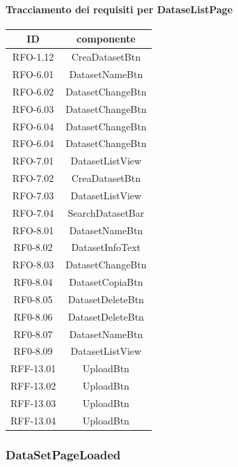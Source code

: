\paragraph{Tracciamento dei requisiti per DataseListPage}
\begin{tabularx}{\textwidth}{|c|c|}
    \hline
    \textbf{ID} & \textbf{componente} \\
    \hline
        RFO-1.12 & CreaDatasetBtn\\
    \hline
        RFO-6.01 & DatasetNameBtn\\
    \hline
        RFO-6.02 & DatasetChangeBtn\\
    \hline
        RFO-6.03 & DatasetChangeBtn\\
    \hline
        RFO-6.04 & DatasetChangeBtn\\
    \hline
        RFO-6.04 & DatasetChangeBtn\\
    \hline
        RFO-7.01 & DatasetListView\\
    \hline
        RFO-7.02 & CreaDatasetBtn\\
    \hline
        RFO-7.03 & DatasetListView\\
    \hline
        RFO-7.04 & SearchDatasetBar\\
    \hline
        RFO-8.01 & DatasetNameBtn\\
    \hline
        RF0-8.02 & DatasetInfoText\\
    \hline
        RFO-8.03 & DatasetChangeBtn\\
    \hline
        RF0-8.04 & DatasetCopiaBtn\\
    \hline
        RF0-8.05 & DatasetDeleteBtn\\
    \hline
        RF0-8.06 & DatasetDeleteBtn\\
    \hline
        RF0-8.07 & DatasetNameBtn\\
    \hline
        RF0-8.09 & DatasetListView\\
    \hline
        RFF-13.01 & UploadBtn\\
    \hline
        RFF-13.02 & UploadBtn\\
    \hline
        RFF-13.03 & UploadBtn\\
    \hline
        RFF-13.04 & UploadBtn\\
    \hline
\end{tabularx}

\subsubsection{DataSetPageLoaded}
\label{sec:DataSetPageLoaded}
